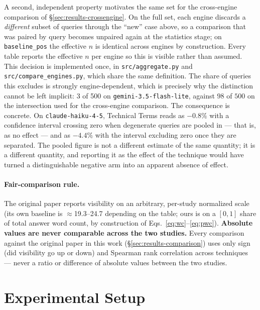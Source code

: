 \documentclass[11pt,a4paper]{article}
\begin{document}
A second, independent property motivates the same set for the cross-engine
comparison of \S\ref{sec:results-crossengine}. On the full set, each engine
discards a \emph{different} subset of queries through the ``new'' case
above, so a comparison that was paired by query becomes unpaired again at
the statistics stage; on \texttt{baseline\_pos} the effective $n$ is
identical across engines by construction. Every table reports the effective
$n$ per engine so this is visible rather than assumed. This decision is
implemented once, in \texttt{src/aggregate.py} and
\texttt{src/compare\_engines.py}, which share the same definition.
The share of queries this excludes is strongly engine-dependent, which is
precisely why the distinction cannot be left implicit: 3 of 500 on
\texttt{gemini-3.5-flash-lite}, against $98$ of $500$ on the intersection
used for the cross-engine comparison. The consequence is concrete. On
\texttt{claude-haiku-4-5}, Technical Terms reads as $-0.8\%$ with a
confidence interval crossing zero when degenerate queries are pooled in ---
that is, as no effect --- and as $-4.4\%$ with the interval excluding zero
once they are separated. The pooled figure is not a different estimate of
the same quantity; it is a different quantity, and reporting it as the
effect of the technique would have turned a distinguishable negative arm
into an apparent absence of effect.

\paragraph{Fair-comparison rule.} The original paper reports visibility on
an arbitrary, per-study normalized scale (its own baseline is
$\approx$19.3--24.7 depending on the table; ours is on a $[0,1]$ share of
total answer word count, by construction of Eqs.~\ref{eq:wc}--\ref{eq:pwc}).
\textbf{Absolute values are never comparable across the two studies.} Every
comparison against the original paper in this work (\S\ref{sec:results-comparison})
uses only sign (did visibility go up or down) and Spearman rank correlation
across techniques --- never a ratio or difference of absolute values between
the two studies.

\section{Experimental Setup}
\label{sec:setup}
\end{document}
